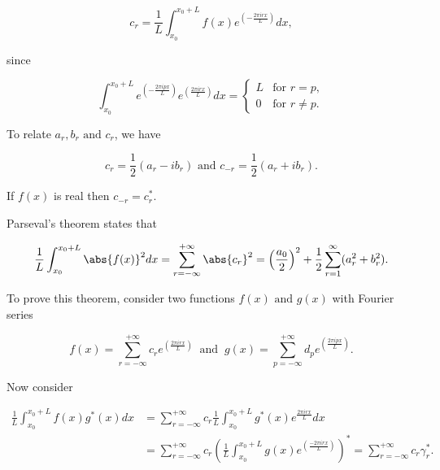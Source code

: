 \documentclass[english,a4paper,12pt]{report}
\begin{document}
\begin{equation}
    c_{r} = \frac{1}{L} \int_{x_0 }^{x_0 + L} f(x)e^{\left( -\frac{2\pi irx}{L}  \right)}dx,     
\end{equation}

since

\begin{equation}
    \int_{x_0 }^{x_0 + L} e^{\left( -\frac{2\pi ipx}{L}\right)} e^{\left( \frac{2\pi irx}{L} \right)} dx = \begin{cases} L & \text{for } r=p, \\ 0 & \text{for } r\neq p.\end{cases}   
\end{equation}

To relate \(a_{r},b_{r} \text { and } c_{r}  \), we have

\begin{equation}
    c_{r} = \frac{1}{2} (a_{r} -ib_{r}  ) \text { and } c_{-r} = \frac{1}{2}(a_{r} + ib_{r}  ).   
\end{equation}

If \(f(x)\) is real then \(c_{-r} = c_{r}^*  \).

Parseval's theorem states that 

\begin{equation}
    \frac{1}{L} \int_{x_0 }^{x_0 + L} \abs{f(x)}^2 dx = \sum_{r=-\infty}^{+\infty} \abs{c_{r} }^2 = \left(\frac{a_0 }{2} \right)^2 + \frac{1}{2} \sum_{r=1}^{\infty} (a_{r}^2 + b_{r}^2).         
\end{equation}

To prove this theorem, consider two functions \(f(x) \text { and } g(x)\) with Fourier series 

\begin{equation}
    f(x) = \sum_{r=-\infty}^{+\infty} c_{r} e^{\left( \frac{2\pi irx}{L}  \right)} ~\text { and }~ g(x) = \sum_{p=-\infty}^{+\infty} d_{p} e^{\left( \frac{2\pi ipx}{L}  \right)}.      
\end{equation}

Now consider 

\begin{equation}
    \begin{aligned} 
    \frac{1}{L} \int_{x_0 }^{x_0 + L} f(x)g^*(x)dx &= \sum_{r=-\infty}^{+\infty} c_{r} \frac{1}{L} \int_{x_0 }^{x_0 + L} g^*(x) e^{\frac{2\pi irx}{L} }dx \\ &= \sum_{r=-\infty}^{+\infty} c_{r} \left( \frac{1}{L} \int_{x_0 }^{x_0 + L} g(x) e^{\left( \frac{-2\pi irx}{L}  \right)}   \right)^* = \sum_{r=-\infty}^{+\infty} c_{r} \gamma _{r}^*.            
    \end{aligned} 
\end{equation}
\end{document}
